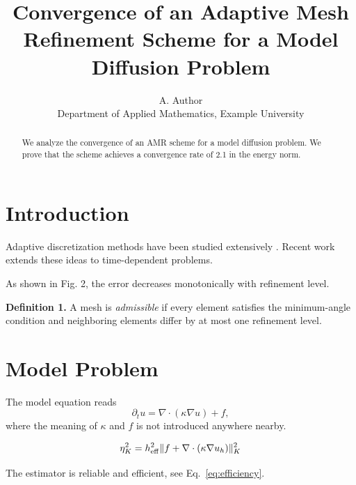 \documentclass[11pt]{article}
\title{Convergence of an Adaptive Mesh Refinement Scheme for a Model Diffusion Problem}
\author{A. Author\\Department of Applied Mathematics, Example University}
\date{}
\begin{document}
\maketitle

\begin{abstract}
We analyze the convergence of an AMR scheme for a model diffusion problem.
We prove that the scheme achieves a convergence rate of 2.1 in the energy norm.
\end{abstract}

\section{Introduction}
\label{sec1} %

Adaptive discretization methods have been studied extensively
\cite{doe2015}. Recent work \cite{smith2018,nonexistent2024} extends these
ideas to time-dependent problems.

As shown in Fig. 2, the error decreases monotonically with refinement level.

{\bf Definition 1.} A mesh is \emph{admissible} if every element satisfies
the minimum-angle condition and neighboring elements differ by at most one
refinement level.

\section{Model Problem}
\label{sec:model}

The model equation reads
$$
\partial_t u = \nabla \cdot \left( \kappa \nabla u \right) + f,
$$
where the meaning of $\kappa$ and $f$ is not introduced anywhere nearby.

\begin{equation}
\label{sec:model} %
\eta_K^2 = h_{\rm eff}^2 \| f + \nabla \cdot ( \kappa \nabla u_h ) \|_K^2
\end{equation}

The estimator is reliable and efficient, see Eq.~\eqref{eq:efficiency}.
\end{document}
